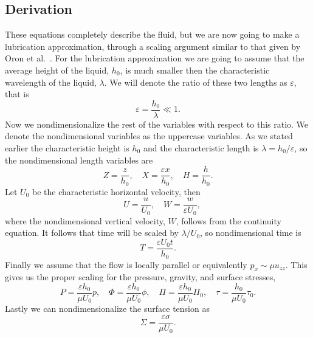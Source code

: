 \subsection{Derivation}
  These equations completely describe the fluid, but we are now going to make a
  lubrication approximation, through a scaling argument similar to that given by Oron
  et al.~\cite{oron1997long}.
  For the lubrication approximation we are going to assume that the average height of
  the liquid, \(h_0\), is much smaller then the characteristic wavelength of the liquid,
  \(\lambda \).
  We will denote the ratio of these two lengths as \(\varepsilon \), that is
  \begin{equation}
    \varepsilon = \frac{h_0}{\lambda} \ll 1.
  \end{equation}
  Now we nondimensionalize the rest of the variables with respect to this ratio.
  We denote the nondimensional variables as the uppercase variables.
  As we stated earlier the characteristic height is \(h_0\) and the characteristic
  length is \(\lambda = h_0/\varepsilon \), so the nondimensional length variables are
  \begin{equation}
    Z = \frac{z}{h_0}, \quad X = \frac{\varepsilon x}{h_0}, \quad H = \frac{h}{h_0}.
  \end{equation}
  Let \(U_0\) be the characteristic horizontal velocity, then
  \begin{equation}
    \quad U = \frac{u}{U_0}, \quad W = \frac{w}{\varepsilon U_0},
  \end{equation}
  where the nondimensional vertical velocity, \(W\), follows from the continuity
  equation.
  It follows that time will be scaled by \(\lambda/U_0\), so nondimensional time is
  \begin{equation}
    T = \frac{\varepsilon U_0 t}{h_0}.
  \end{equation}
  Finally we assume that the flow is locally parallel or equivalently
  \(p_x \sim \mu u_{zz}\).
  This gives us the proper scaling for the pressure, gravity, and surface stresses,
  \begin{equation}
    P = \frac{\varepsilon h_0}{\mu U_0} p, \quad
    \Phi = \frac{\varepsilon h_0}{\mu U_0}\phi, \quad
    \Pi = \frac{\varepsilon h_0}{\mu U_0}\Pi_0, \quad
    \tau = \frac{h_0}{\mu U_0}\tau_0.
  \end{equation}
  Lastly we can nondimensionalize the surface tension as
  \begin{equation}
    \Sigma = \frac{\varepsilon \sigma}{\mu U_0}.
  \end{equation}
